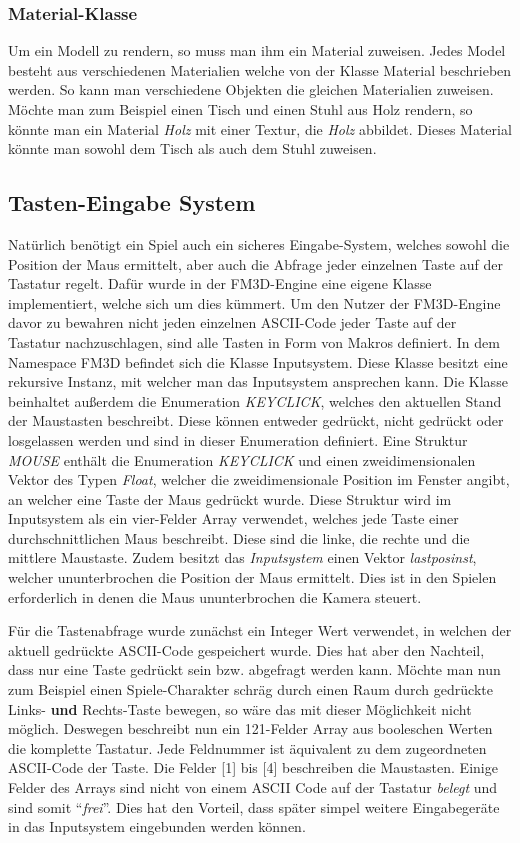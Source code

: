 \subsubsection{Material-Klasse}
Um ein Modell zu rendern, so muss man ihm ein Material zuweisen. Jedes Model besteht aus verschiedenen Materialien welche von der Klasse Material beschrieben werden.
So kann man verschiedene Objekten die gleichen Materialien zuweisen. Möchte man zum Beispiel einen Tisch und einen Stuhl aus Holz rendern, so könnte man ein Material \textit{Holz} mit einer Textur, die \textit{Holz} abbildet. Dieses Material könnte man sowohl dem Tisch als auch dem Stuhl zuweisen.



\subsection{Tasten-Eingabe System}
Natürlich benötigt ein Spiel auch ein sicheres Eingabe-System, welches sowohl die Position der Maus ermittelt, aber auch die Abfrage jeder einzelnen Taste auf der Tastatur regelt. 
Dafür wurde in der FM3D-Engine eine eigene Klasse implementiert, welche sich um dies kümmert.
Um den Nutzer der FM3D-Engine davor zu bewahren nicht jeden einzelnen ASCII-Code jeder Taste auf der Tastatur nachzuschlagen, sind alle Tasten in Form von Makros definiert. 
In dem Namespace FM3D befindet sich die Klasse Inputsystem. Diese Klasse besitzt eine rekursive Instanz, mit welcher man das Inputsystem ansprechen kann. 
Die Klasse beinhaltet außerdem die Enumeration \textit{KEYCLICK}, welches den aktuellen Stand der Maustasten beschreibt. Diese können entweder gedrückt, nicht gedrückt oder losgelassen werden und sind in dieser Enumeration definiert.
Eine Struktur \textit{MOUSE} enthält die Enumeration \textit{KEYCLICK} und einen zweidimensionalen Vektor des Typen \textit{Float}, welcher die zweidimensionale Position im Fenster angibt, an welcher eine Taste der Maus gedrückt wurde.
Diese Struktur wird im Inputsystem als ein vier-Felder Array verwendet, welches jede Taste einer durchschnittlichen Maus beschreibt. Diese sind die linke, die rechte und die mittlere Maustaste. 
Zudem besitzt das \textit{Inputsystem} einen Vektor \textit{lastposinst}, welcher ununterbrochen die Position der Maus ermittelt. Dies ist in den Spielen erforderlich in denen die Maus ununterbrochen die Kamera steuert.

Für die Tastenabfrage wurde zunächst ein Integer Wert verwendet, in welchen der aktuell gedrückte ASCII-Code gespeichert wurde. Dies hat aber den Nachteil, dass nur eine Taste gedrückt sein bzw. abgefragt werden kann. Möchte man nun zum Beispiel einen Spiele-Charakter schräg durch einen Raum durch gedrückte Links- \textbf{und} Rechts-Taste bewegen, so wäre das mit dieser Möglichkeit nicht möglich. Deswegen beschreibt nun ein 121-Felder Array aus booleschen Werten die komplette Tastatur. Jede Feldnummer ist äquivalent zu dem zugeordneten ASCII-Code der Taste. Die Felder [1] bis [4] beschreiben die Maustasten. Einige Felder des Arrays sind nicht von einem ASCII Code auf der Tastatur \textit{belegt} und sind somit "`\textit{frei}"'. Dies hat den Vorteil, dass später simpel weitere Eingabegeräte in das Inputsystem eingebunden werden können.

